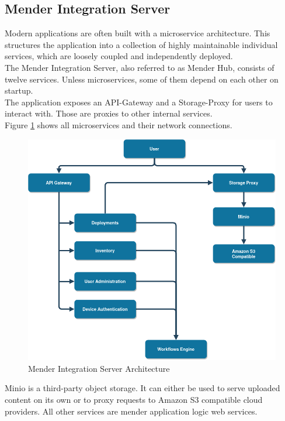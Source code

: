 \subsection{Mender Integration Server}
Modern applications are often built with a microservice architecture. This structures the application into a collection of highly maintainable individual services, which are loosely coupled and independently deployed.\cite{microservicesio}\\
The Mender Integration Server, also referred to as Mender Hub, consists of twelve services. Unless microservices, some of them depend on each other on startup.\\
The application exposes an API-Gateway and a Storage-Proxy for users to interact with. Those are proxies to other internal services.\cite{mender-github}\\
Figure \ref{fig:mender-integration} shows all microservices and their network connections.
\begin{figure}
    \centering
    \includegraphics[scale=0.5]{images/integration-app.png}
    \caption{Mender Integration Server Architecture}
    \label{fig:mender-integration}
\end{figure}
Minio is a third-party object storage. It can either be used to serve uploaded content on its own or to proxy requests to Amazon S3 compatible cloud providers. All other services are mender application logic web services.

